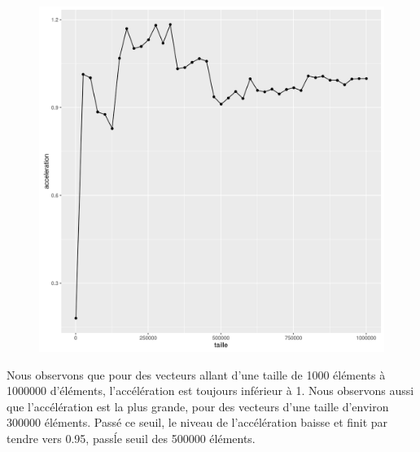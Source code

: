 \documentclass[a4paper,11pt]{scrartcl}
\begin{document}
\begin{figure}[H] \center
   \includegraphics[scale=0.5] {graphes/global_temps_machine_accel16.png}
\end{figure}

Nous observons que pour des vecteurs allant d'une taille de 1000 \'el\'ements \`a 1000000 d'\'el\'ements, l'acc\'el\'eration est toujours inf\'erieur \`a 1. Nous observons aussi que l'acc\'el\'eration est la plus grande, pour des vecteurs d'une taille d'environ 300000 \'el\'ements. Pass\'e ce seuil, le niveau de l'acc\'el\'eration baisse et finit par tendre vers 0.95, pass\' le seuil des 500000 \'el\'ements.   
\end{document}
